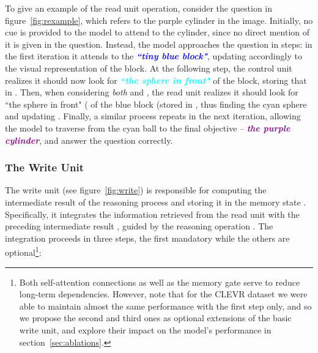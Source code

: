 \documentclass[fleqn]{article}
\newcommand{\figref}[1]{figure~\ref{fig:#1}}
\newcommand{\secref}[1]{section~\ref{sec:#1}}
\begin{document}
To give an example of the read unit operation, consider the question in \figref{rexample}, which refers to the purple cylinder in the image. Initially, no cue is provided to the model to attend to the cylinder, since no direct mention of it is given in the question. Instead, the model approaches the question in steps: in the first iteration it attends to the \textcolor{blue}{\textit{\textbf{``tiny blue block"}}}, updating  accordingly to the visual representation of the block. At the following step, the control unit realizes it should now look for \textcolor{cyan}{\textit{\textbf{``the sphere in front"}}} of the block, storing that in . Then, when considering \textit{both}  and , the read unit realizes it should look for ``the sphere in front" ( of the blue block (stored in , thus finding the cyan sphere and updating . Finally, a similar process repeats in the next iteration, allowing the model to traverse from the cyan ball to the final objective -- \textcolor{purple}{\textit{\textbf{the purple cylinder}}}, and answer the question correctly.

\newpage
\subsubsection{The Write Unit}
\label{sec:WU}
The write unit (see \figref{write}) is responsible for computing the  intermediate result of the reasoning process and storing it in the memory state . Specifically, it integrates the information retrieved from the read unit  with the preceding intermediate result , guided by the  reasoning operation . The integration proceeds in three steps, the first mandatory while the others are optional\footnote{Both self-attention connections as well as the memory gate serve to reduce long-term dependencies. However, note that for the CLEVR dataset we were able to maintain almost the same performance with the first step only, and so we propose the second and third ones as optional extensions of the basic write unit, and explore their impact on the model's performance in \secref{ablations}.}:
\end{document}
